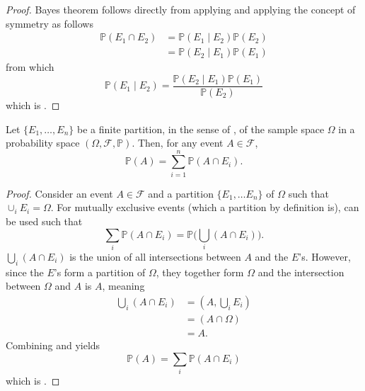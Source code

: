 \begin{proof}
	Bayes theorem follows directly from applying  and applying the concept of symmetry as follows
	\begin{equation}
		\begin{split}
			\mathbb{P}(E_1 \cap E_2) &= \mathbb{P}(E_1\mid  E_2)\mathbb{P}(E_2) \\
			& = \mathbb{P}(E_2\mid E_1)\mathbb{P}(E_1)
		\end{split}
		\label{eq:c2}
	\end{equation}
	from which
	\begin{equation}
		\mathbb{P}(E_1\mid  E_2) = \frac{\mathbb{P}(E_2\mid  E_1)\mathbb{P}(E_1)}{\mathbb{P}(E_2)}
	\end{equation}
	which is .
\end{proof}

\begin{theorem}
	\label{theorem:law_of_total_probability}
	Let $\{E_1, \dots, E_n\}$ be a finite partition, in the sense of , of the sample space $\Omega$ in a probability space $(\Omega, \mathcal{F}, \mathbb{P})$. Then, for any event $A \in \mathcal{F}$,
	\begin{equation}
		\mathbb{P}(A) = \sum_{i=1}^n \mathbb{P}(A \cap E_i).
		\label{eq:law_total_probability}
	\end{equation}
\end{theorem}

\begin{proof}
	Consider an event $A\in \mathcal{F}$ and a partition $\{E_1,\dots E_n\}$ of $\Omega$ such that $\cup_{i}E_i=\Omega$. For mutually exclusive events (which a partition by definition is),  can be used such that
	\begin{equation}
		\sum_{i}\mathbb{P}(A \cap E_i) = \mathbb{P}\bigg(\bigcup_{i}(A \cap E_i)\bigg).
		\label{eq:qq1}
	\end{equation} 
	$\bigcup_{i}(A \cap E_i)$ is the union of all intersections between $A$ and the $E$'s. However, since the $E$'s form a partition of $\Omega$, they together form $\Omega$ and the intersection between $\Omega$ and $A$ is $A$, meaning
	\begin{equation}
		\begin{split}
			\bigcup_{i}(A \cap E_i)  &= (A,\bigcup_{i}E_i)\\
			&= (A \cap \Omega)\\
			& =A.
		\end{split}
		\label{eq:qq2}
	\end{equation}
	Combining  and  yields
	\begin{equation}
		\mathbb{P}(A) = \sum_{i} \mathbb{P}(A \cap E_i)
	\end{equation}
	which is .
\end{proof}

